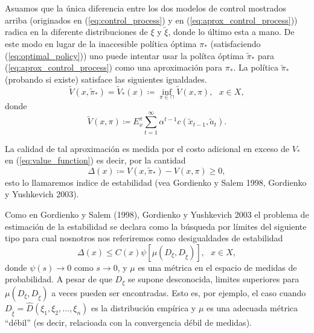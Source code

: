 \documentclass[11pt, spanish]{amsart}
\begin{document}
Asuamos que la única diferencia entre los dos modelos de control mostrados
arriba (originados en (\ref{eq:control_process}) y en (\ref{eq:aprox_control_process}))
radica en la diferente distribuciones de $\xi$ y $\widetilde{\xi}$,
donde lo último esta a mano. De este modo en lugar de la inaccesible
política óptima $\pi_{*}$ (satisfaciendo (\ref{eq:optimal_policy}))
uno puede intentar usar la polítca óptima $\widetilde{\pi}_{*}$ para
(\ref{eq:aprox_control_process}) como una aproximación para $\pi_{*}$.
La política $\widetilde{\pi}_{*}$ (probando si existe) satisface
las siguientes igualdades. 
\begin{equation}
\widetilde{V}\left(x,\widetilde{\pi}_{*}\right)=\widetilde{V}_{*}\left(x\right)\coloneqq\inf_{\pi\in\sqcap}\widetilde{V}\left(x,\pi\right),\text{ }x\in X,\label{eq:tilde_value_function}
\end{equation}
donde 
\begin{equation}
\widetilde{V}\left(x,\pi\right)\coloneqq E_{x}^{\pi}\sum_{t=1}^{\infty}\alpha^{t-1}c\left(\widetilde{x}_{t-1},\widetilde{a}_{t}\right).\label{eq:tilde_discounted_cost}
\end{equation}

La calidad de tal aproximación es medida por el costo adicional en
exceso de $V_{*}$ en (\ref{eq:value_function}) es decir, por la
cantidad 
\begin{equation}
\Delta\left(x\right)\coloneqq V\left(x,\widetilde{\pi}_{*}\right)-V\left(x,\pi\right)\geq0,\label{eq:stability_index}
\end{equation}
esto lo llamaremos indice de estabilidad (vea Gordienko y Salem 1998,
Gordienko y Yushkevich 2003).

Como en Gordienko y Salem (1998), Gordienko y Yushkevich 2003 el problema
de estimación de la estabilidad se declara como la búsqueda por límites
del siguiente tipo para cual nosnotros nos referiremos como desigualdades
de estabilidad 
\begin{equation}
\Delta\left(x\right)\leq C\left(x\right)\psi\left[\mu\left(D_{\xi},D_{\widetilde{\xi}}\right)\right],\text{ }x\in X,\label{eq:stability_inequalities}
\end{equation}
donde $\psi\left(s\right)\to0$ como $s\to0$, y $\mu$ es una métrica
en el espacio de medidas de probabilidad. A pesar de que $D_{\xi}$
se supone desconocida, limites superiores para $\mu\left(D_{\xi},D_{\widetilde{\xi}}\right)$
a veces pueden ser encontradas. Esto es, por ejemplo, el caso cuando
$D_{\widetilde{\xi}}=\widehat{D}\left(\xi_{1},\xi_{2},\ldots,\xi_{n}\right)$
es la distribución empírica y $\mu$ es una adecuada métrica ``débil''
(es decir, relacioada con la convergencia débil de medidas).
\end{document}
